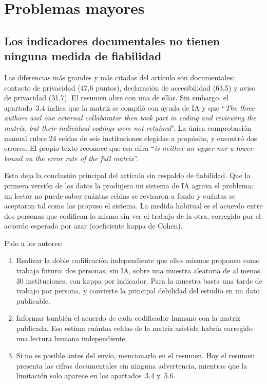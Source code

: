 \documentclass[11pt,a4paper]{article}
\newcommand{\cita}[1]{``\textit{#1}''}
\begin{document}
\section{Problemas mayores}

\subsection{Los indicadores documentales no tienen ninguna medida de fiabilidad}\label{sec:fiabilidad}

Las diferencias m\'as grandes y m\'as citadas del art\'iculo son documentales: contacto de privacidad (47,6 puntos), declaraci\'on de accesibilidad (63,5) y aviso de privacidad (31,7). El resumen abre con una de ellas. Sin embargo, el apartado~3.4 indica que la matriz se compil\'o con ayuda de IA y que \cita{The three authors and one external collaborator then took part in coding and reviewing the matrix, but their individual codings were not retained}. La \'unica comprobaci\'on manual cubre 24 celdas de seis instituciones elegidas a prop\'osito, y encontr\'o dos errores. El propio texto reconoce que esa cifra \cita{is neither an upper nor a lower bound on the error rate of the full matrix}.

Esto deja la conclusi\'on principal del art\'iculo sin respaldo de fiabilidad. Que la primera versi\'on de los datos la produjera un sistema de IA agrava el problema: un lector no puede saber cu\'antas celdas se revisaron a fondo y cu\'antas se aceptaron tal como las propuso el sistema. La medida habitual es el acuerdo entre dos personas que codifican lo mismo sin ver el trabajo de la otra, corregido por el acuerdo esperado por azar (coeficiente kappa de Cohen).

Pido a los autores:
\begin{enumerate}
	\item Realizar la doble codificaci\'on independiente que ellos mismos proponen como trabajo futuro: dos personas, sin IA, sobre una muestra aleatoria de al menos 30 instituciones, con kappa por indicador. Para la muestra basta una tarde de trabajo por persona, y convierte la principal debilidad del estudio en un dato publicable.
	\item Informar tambi\'en el acuerdo de cada codificador humano con la matriz publicada. Eso estima cu\'antas celdas de la matriz asistida habr\'ia corregido una lectura humana independiente.
	\item Si no es posible antes del env\'io, mencionarlo en el resumen. Hoy el resumen presenta las cifras documentales sin ninguna advertencia, mientras que la limitaci\'on solo aparece en los apartados~3.4 y~5.6.
\end{enumerate}
\end{document}

